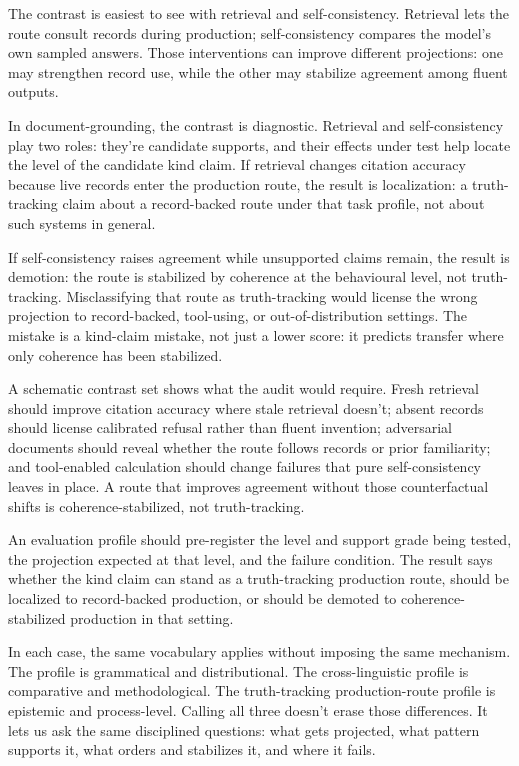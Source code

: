 \documentclass[12pt]{article}
\begin{document}
The contrast is easiest to see with retrieval and self\mbox{-}consistency.
Retrieval lets the route consult records during production; self\mbox{-}consistency
compares the model's own sampled answers. Those interventions can improve
different projections: one may strengthen record use, while the other may stabilize
agreement among fluent outputs.

In document-grounding, the contrast is diagnostic. Retrieval and
self\mbox{-}consistency play two roles: they're candidate supports, and their
effects under test help locate the level of the candidate kind claim. If
retrieval changes citation accuracy because live records enter the production
route, the result is localization: a truth\mbox{-}tracking claim about a
record-backed route under that task profile, not about such systems in general.

If self\mbox{-}consistency raises agreement while
unsupported claims remain, the result is demotion: the route is
stabilized by coherence at the behavioural level, not truth\mbox{-}tracking.
Misclassifying that route as truth\mbox{-}tracking would license the wrong
projection to record-backed, tool-using, or out-of-distribution settings.
The mistake is a kind-claim mistake, not just a lower score: it predicts
transfer where only coherence has been stabilized.

A schematic contrast set shows what the audit would require. Fresh retrieval
should improve citation accuracy where stale retrieval doesn't; absent records
should license calibrated refusal rather than fluent invention; adversarial
documents should reveal whether the route follows records or prior familiarity;
and tool-enabled calculation should change failures that pure self-consistency
leaves in place. A route that improves agreement without those counterfactual
shifts is coherence-stabilized, not truth-tracking.

An evaluation profile should pre-register the level and support grade being
tested, the projection expected at that level, and the failure condition. The
result says whether the kind claim can stand as a truth\mbox{-}tracking
production route, should be localized to record-backed production, or should be
demoted to coherence\mbox{-}stabilized production in that setting.

In each case, the same vocabulary applies without imposing the same mechanism.
The  profile is grammatical and distributional. The
cross-linguistic profile is comparative and methodological. The
truth\mbox{-}tracking production-route profile is epistemic and process-level.
Calling all three  doesn't erase those differences. It lets us ask
the same disciplined questions: what gets projected, what pattern supports it,
what orders and stabilizes it, and where it fails.
\end{document}
